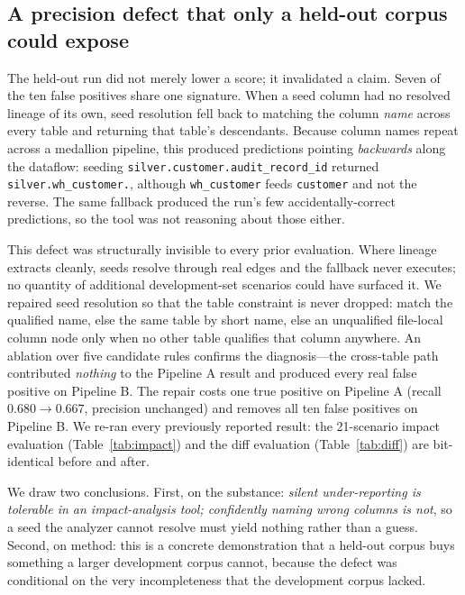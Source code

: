 \documentclass[11pt]{article}
\newcommand{\code}[1]{\texttt{#1}}
\begin{document}
\subsection{A precision defect that only a held-out corpus could expose}
\label{sec:precision-defect}
The held-out run did not merely lower a score; it invalidated a claim. Seven of the
ten false positives share one signature. When a seed column had no resolved lineage
of its own, seed resolution fell back to matching the column \emph{name} across every
table and returning that table's descendants. Because column names repeat across a
medallion pipeline, this produced predictions pointing \emph{backwards} along the
dataflow: seeding \code{silver.\allowbreak customer.\allowbreak audit\_record\_id} returned
\code{silver.\allowbreak wh\_customer.\allowbreak *}, although \code{wh\_customer} feeds \code{customer} and not
the reverse. The same fallback produced the run's few accidentally-correct
predictions, so the tool was not reasoning about those either.

This defect was structurally invisible to every prior evaluation. Where lineage
extracts cleanly, seeds resolve through real edges and the fallback never executes;
no quantity of additional development-set scenarios could have surfaced it. We
repaired seed resolution so that the table constraint is never dropped: match the
qualified name, else the same table by short name, else an unqualified file-local
column node only when no other table qualifies that column anywhere. An ablation over
five candidate rules confirms the diagnosis---the cross-table path contributed
\emph{nothing} to the Pipeline A result and produced every real false positive on Pipeline B.
The repair costs one true positive on Pipeline A (recall $0.680 \rightarrow 0.667$,
precision unchanged) and removes all ten false positives on Pipeline B. We re-ran every
previously reported result: the 21-scenario impact evaluation
(Table~\ref{tab:impact}) and the diff evaluation (Table~\ref{tab:diff}) are
bit-identical before and after.

We draw two conclusions. First, on the substance: \emph{silent under-reporting is
tolerable in an impact-analysis tool; confidently naming wrong columns is not}, so a
seed the analyzer cannot resolve must yield nothing rather than a guess. Second, on
method: this is a concrete demonstration that a held-out corpus buys something a
larger development corpus cannot, because the defect was conditional on the very
incompleteness that the development corpus lacked.
\end{document}
